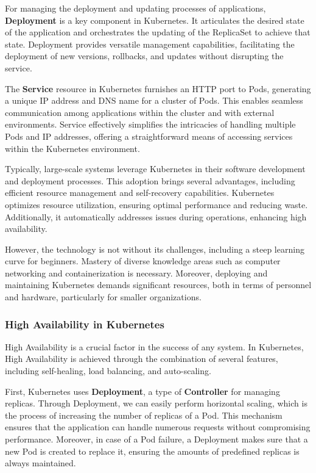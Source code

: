 For managing the deployment and updating processes of applications,
\textbf{Deployment} is a key component in Kubernetes. It articulates the desired
state of the application and orchestrates the updating of the ReplicaSet to
achieve that state. Deployment provides versatile management capabilities,
facilitating the deployment of new versions, rollbacks, and updates without
disrupting the service.

The \textbf{Service} resource in Kubernetes furnishes an HTTP port to Pods,
generating a unique IP address and DNS name for a cluster of Pods. This enables
seamless communication among applications within the cluster and with external
environments. Service effectively simplifies the intricacies of handling
multiple Pods and IP addresses, offering a straightforward means of accessing
services within the Kubernetes environment.

Typically, large-scale systems leverage Kubernetes in their software development
and deployment processes. This adoption brings several advantages, including
efficient resource management and self-recovery capabilities. Kubernetes
optimizes resource utilization, ensuring optimal performance and reducing waste.
Additionally, it automatically addresses issues during operations, enhancing
high availability.

However, the technology is not without its challenges, including a steep
learning curve for beginners. Mastery of diverse knowledge areas such as
computer networking and containerization is necessary. Moreover, deploying and
maintaining Kubernetes demands significant resources, both in terms of personnel
and hardware, particularly for smaller organizations.

\subsubsection*{High Availability in Kubernetes}
High Availability is a crucial factor in the success of any system. In
Kubernetes, High Availability is achieved through the combination of several
features, including self-healing, load balancing, and auto-scaling.

First, Kubernetes uses \textbf{Deployment}, a type of \textbf{Controller} for
managing replicas. Through Deployment, we can easily perform horizontal scaling,
which is the process of increasing the number of replicas of a Pod. This
mechanism ensures that the application can handle numerous requests without
compromising performance. Moreover, in case of a Pod failure, a Deployment makes
sure that a new Pod is created to replace it, ensuring the amounts of predefined
replicas is always maintained.


